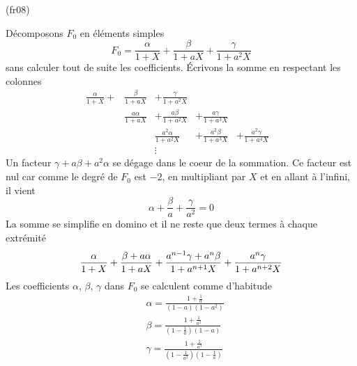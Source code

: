 \begin{tiny}(fr08)\end{tiny} Décomposons $F_0$ en éléments simples
\begin{displaymath}
 F_0 = \frac{\alpha}{1+X} + \frac{\beta}{1+aX} + \frac{\gamma}{1+a^2X}
\end{displaymath}
sans calculer tout de suite les coefficients. \'Ecrivons la somme en respectant les colonnes
\begin{align*}
 \frac{\alpha}{1+X} + &\frac{\beta}{1+aX}& +   \frac{\gamma}{1+a^2X}   &                          &                           &\\
                      &\frac{a\alpha}{1+aX}& + \frac{a\beta}{1+a^2X}   & + \frac{a\gamma}{1+a^3X} &                           &\\
                   &                       &   \frac{a^2\alpha}{1+a^2X}& + \frac{a^2\beta}{1+a^3X}& + \frac{a^2\gamma}{1+a^4X}&\\               &                       &      \vdots               &                          &                     &   
\end{align*}
 Un facteur $\gamma + a\beta + a^2\alpha$ se dégage dans le coeur de la sommation. Ce facteur est nul car comme le degré de $F_0$ est $-2$, en multipliant par $X$ et en allant à l'infini, il vient
\begin{displaymath}
 \alpha + \frac{\beta}{a} + \frac{\gamma}{a^2}=0
\end{displaymath}
La somme se simplifie en domino et il ne reste que deux termes à chaque extrémité
\begin{displaymath}
 \frac{\alpha}{1+X}+\frac{\beta + a\alpha}{1+aX}\\
+\frac{a^{n-1}\gamma + a^{n}\beta}{1+a^{n+1}X}+\frac{a^n\gamma}{1+a^{n+2}X}
\end{displaymath}
Les coefficients $\alpha$, $\beta$, $\gamma$ dans $F_0$ se calculent comme d'habitude
\begin{align*}
 &\alpha = \frac{1+\frac{1}{a}}{(1-a)(1-a^2)}\\
&\beta = \frac{1+\frac{1}{a^2}}{(1-\frac{1}{a})(1-a)}\\
&\gamma = \frac{1+\frac{1}{a^3}}{(1-\frac{1}{a^2})(1-\frac{1}{a})}
\end{align*}

 
